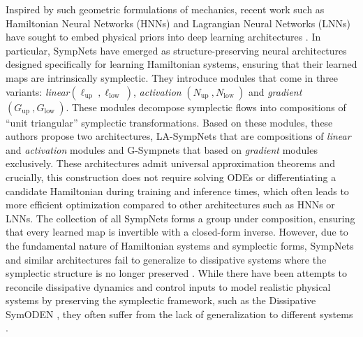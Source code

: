 Inspired by such geometric formulations of mechanics, recent work such as Hamiltonian Neural Networks (HNNs) and Lagrangian Neural Networks (LNNs) have sought to embed physical priors into deep learning architectures \cite{greydanus2019hamiltonianneuralnetworks,cranmer2020lagrangianneuralnetworks}. In particular, SympNets have emerged as structure-preserving neural architectures designed specifically for learning Hamiltonian systems, ensuring that their learned maps are intrinsically symplectic. They introduce modules that come in three variants: \emph{linear}$\left(\ell_{\text {up }}, \ell_{\text {low }}\right)$,
\emph{activation} $\left(N_{\text {up }}, N_{\text {low }}\right)$ and \emph{gradient}
$\left(G_{\text {up }}, G_{\text {low }}\right)$. These modules decompose symplectic flows into compositions of “unit triangular” symplectic transformations. Based on these modules, these authors propose two architectures, LA-SympNets that are compositions of \emph{linear} and \emph{activation} modules and G-Sympnets that based on \emph{gradient} modules exclusively. These architectures admit universal approximation theorems and crucially, this construction does not require solving ODEs or differentiating a candidate Hamiltonian during training and inference times, which often leads to more efficient optimization compared to other architectures such as HNNs or LNNs. The collection of all SympNets forms a group under composition, ensuring that every learned map is invertible with a closed-form inverse. However, due to the fundamental nature of Hamiltonian systems and symplectic forms, SympNets and similar architectures fail to generalize to dissipative systems where the symplectic structure is no longer preserved \cite{chen2020symplecticrecurrentneuralnetworks, cranmer2020lagrangianneuralnetworks,jin2020sympnetsintrinsicstructurepreservingsymplectic}. While there have been attempts to reconcile dissipative dynamics and control inputs to model realistic physical systems by preserving the symplectic framework, such as the Dissipative SymODEN \cite{zhong2020dissipativesymodenencodinghamiltonian,zhong2024symplecticodenetlearninghamiltonian},  they often suffer from the lack of generalization to different systems \cite{okamoto2024learningdeepdissipativedynamics}. 

